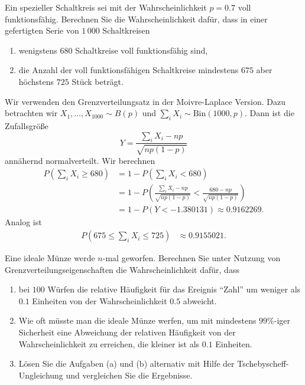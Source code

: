  Ein spezieller
Schaltkreis sei mit der Wahrscheinlichkeit $p=0.7$ voll funktionsfähig.
Berechnen Sie die Wahrscheinlichkeit dafür, dass in einer 
gefertigten Serie von $1\,000$ Schaltkreisen 
\begin{enumerate}
    \item wenigstens $680$ Schaltkreise voll funktionsfähig sind,

    \item die Anzahl der voll funktionsfähigen Schaltkreise mindestens
        $675$ aber höchstens $725$ Stück beträgt.
\end{enumerate}

\solution Wir verwenden den Grenzverteilungsatz in der
Moivre-Laplace Version.  Dazu betrachten wir $X_1,\dots ,X_{1000} \sim B(p)$
und $\sum_{i} X_i \sim \text{Bin}(1000,p)$.  Dann ist die Zufallsgröße
\begin{equation*}
    Y = \frac{ \sum_{i} X_i - np}{ \sqrt{np(1-p)} } 
\end{equation*}
annähernd normalverteilt. Wir berechnen
\begin{align*}
    P( \sum_{i} X_i \geq 680 ) &= 1 - P\left( \sum_{i} X_i < 680 \right) \\
    &= 1- P\left( \frac{\sum_{i} X_i - np }{\sqrt{np(1-p)}} < \frac{680-np}{\sqrt{np(1-p)}} \right)\\
    &= 1-P( Y < - 1.380131 ) \approx 0.9162269.
\end{align*}
Analog ist 
\begin{align*}
    P( 675 \leq \sum_{i} X_i \leq 725 ) &\approx 0.9155021.
\end{align*}

 Eine ideale Münze werde $n$-mal 
geworfen. Berechnen Sie unter Nutzung von Grenzverteilungseigenschaften die Wahrscheinlichkeit dafür, dass 
\begin{enumerate}
    \item bei $100$ Würfen die relative Häufigkeit für das Ereignis 
        ``Zahl'' um weniger als $0.1$ Einheiten von der Wahrscheinlichkeit
        $0.5$ abweicht.
    \item Wie oft müsste man die ideale Münze werfen, um mit mindestens
        $99\%$-iger Sicherheit eine Abweichung der relativen Häufigkeit
        von der Wahrscheinlichkeit zu erreichen, die kleiner ist als $0.1$
        Einheiten. 
    \item Lösen Sie die Aufgaben (a) und (b) alternativ mit Hilfe der Tschebyscheff-Ungleichung und vergleichen Sie die Ergebnisse. 
\end{enumerate}

